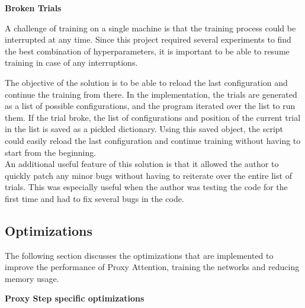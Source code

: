\documentclass[a4paper,11pt,openright]{book}
\begin{document}
\textbf{Broken Trials}

A challenge of training on a single machine is that the training process could be interrupted at any time. Since this project required several experiments to find the best combination of hyperparameters, it is important to be able to resume training in case of any interruptions. 

The objective of the solution is to be able to reload the last configuration and continue the training from there. In the implementation, the trials are generated as a list of possible configurations, and the program iterated over the list to run them. If the trial broke, the list of configurations and position of the current trial in the list is saved as a pickled dictionary. Using this saved object, the script could easily reload the last configuration and continue training without having to start from the beginning.\\
An additional useful feature of this solution is that it allowed the author to quickly patch any minor bugs without having to reiterate over the entire list of trials. This was especially useful when the author was testing the code for the first time and had to fix several bugs in the code.

\subsection{Optimizations}
The following section discusses the optimizations that are implemented to improve the performance of Proxy Attention, training the networks and reducing memory usage.

\textbf{Proxy Step specific optimizations}
\end{document}

